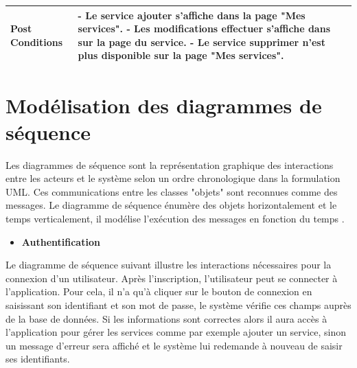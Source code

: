 \documentclass[french]{report}
\begin{document}
\begin{description}
\begin{minipage}{\linewidth}
\begin{tabular}{|m{3cm}|m{9cm}|}
                
            \\ 
            \hline
            Post Conditions & 
                - Le service ajouter s'affiche dans la page "Mes services".
                - Les modifications effectuer s'affiche dans sur la page du service.
                - Le service supprimer n'est plus disponible sur la page "Mes services".  
            \\
            \hline
            \end{tabular}
        \end{minipage}
    \end{description}

\section{Modélisation des diagrammes de séquence}

Les diagrammes de séquence sont la représentation graphique des interactions entre les acteurs et le système
selon un ordre chronologique dans la formulation UML. Ces communications entre les classes "objets" sont
reconnues comme des messages. Le diagramme de séquence énumère des objets horizontalement et le temps 
verticalement, il modélise l'exécution des messages en fonction du temps \cite{UML3}.

\begin{itemize}
\item \textbf{Authentification} 
\end{itemize}
	Le diagramme de séquence suivant illustre les interactions nécessaires pour la connexion d'un utilisateur.
	Après l'inscription, l'utilisateur peut se connecter à l'application. Pour cela, il n'a qu'à cliquer sur
	le bouton de connexion en saisissant son identifiant et son mot de passe, le système vérifie ces champs
	auprès de la base de données. Si les informations sont correctes alors il aura accès à l'application pour
	gérer les services comme par exemple ajouter un service, sinon un message d'erreur sera affiché et 
	le système lui redemande à nouveau de saisir ses identifiants.
	
\end{document}
